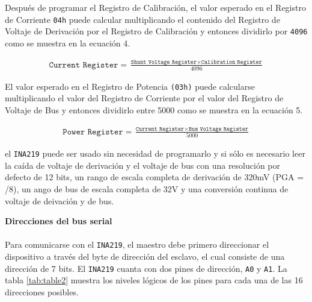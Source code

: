 \documentclass[12pt,a4paper]{article}
\begin{document}
	\vspace{0.3cm}
	Después de programar el Registro de Calibración, el valor esperado en el Registro de Corriente \texttt{04h} puede calcular multiplicando el contenido del Registro de Voltaje de Derivación por el Registro de Calibración y entonces dividirlo por \texttt{4096} como se muestra en la ecuación 4.
	
	\begin{align}
		\texttt{Current Register} = \frac{\texttt{Shunt Voltage Register} \times \texttt{Calibration Register}}{4096}
	\end{align}

	El valor esperado en el Registro de Potencia \texttt{(03h)} puede calcularse multiplicando el valor del Registro de Corriente por el valor del Registro de Voltaje de Bus y entonces dividirlo entre 5000 como se muestra en la ecuación 5. 
	
	\begin{align}
		\texttt{Power Register} = \frac{\texttt{Current Register} \times \texttt{Bus Voltage Register}}{5000}
	\end{align}

	 \begin{tcolorbox}[colback=red!10!white,colframe=red!50!black,title=Configuaciones por defecto. Sin necesidad de programar]
	 	el \texttt{INA219} puede ser usado sin necesidad de programarlo y si sólo es necesario leer la caída de voltaje de derivación y el voltaje de bus con una resolución por defecto de 12 bits, un rango de escala completa de derivación de 320mV (PGA = /8), un ango de bus de escala completa de 32V y una conversión continua de voltaje de deivación y de bus.
	 \end{tcolorbox}
 
 	\vspace{0.3cm}
 	\noindent \textbf{Direcciones del bus serial}\\\\
 	Para comunicarse con el \texttt{INA219}, el maestro debe primero direccionar el dispositivo a través del byte de dirección del esclavo, el cual consiste de una dirección de 7 bits.
 	El \texttt{INA219} cuanta con dos pines de dirección, \texttt{A0} y \texttt{A1}. La tabla \ref{tab:table2} muestra los niveles lógicos de los pines para cada una de las 16 direcciones posibles.
 	
\end{document}
